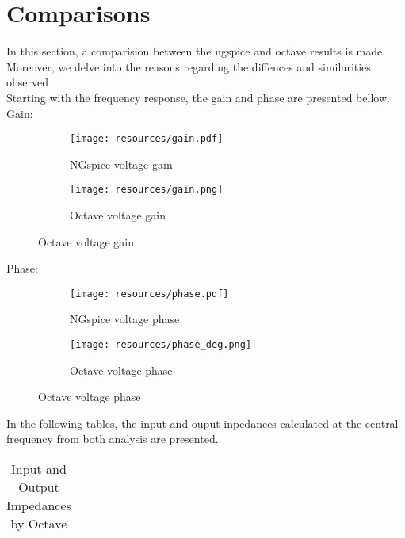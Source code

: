 \section{Comparisons}
\label{sec:comparsisons}

In this section, a comparision between the ngspice and octave results is made. Moreover, we delve into the reasons regarding the diffences and similarities observed\\
Starting with the frequency response, the gain and phase are presented bellow.\\
\FloatBarrier
Gain:


\begin{figure} [!htb] 
	\begin{subfigure}[b]{0.5\textwidth}
		\centering
  		\texttt{[image: resources/gain.pdf]}
  		\caption{NGspice voltage gain}
	\end{subfigure}
  	\begin{subfigure}[b]{0.5\textwidth}
  		\centering
 		 \texttt{[image: resources/gain.png]}
 		 \caption{Octave voltage gain}
  	\end{subfigure}
\end{figure}
\FloatBarrier
\FloatBarrier
Phase:


\begin{figure} [!htb] 
	\begin{subfigure}[b]{0.5\textwidth}
 		 \texttt{[image: resources/phase.pdf]}
  		\caption{NGspice voltage phase}
 		\label{fig:theoplots}
	\end{subfigure}
  	\begin{subfigure}[b]{0.5\textwidth}
  		\texttt{[image: resources/phase\_deg.png]}
 		 \caption{Octave voltage phase}
 		 \label{fig:theoplots}
  	\end{subfigure}
\end{figure}
\FloatBarrier




In the following tables, the input and ouput inpedances  calculated at the central frequency from both analysis are presented.

%    

\FloatBarrier
\begin{table}[h]
  \centering
  \begin{tabular}{|c|c|c|}
    \hline    
    
    \hline
  \end{tabular}
  \caption{Input and Output Impedances by Octave}
  \label{tab:Spice1}
\end{table}
\FloatBarrier   



